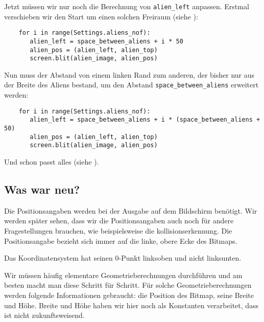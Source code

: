 Jetzt müssen wir nur noch die Berechnung von \texttt{alien\_left} anpassen. Erstmal verschieben wir den Start um einen solchen Freiraum (siehe ):

\lstset{firstnumber=43}
\begin{lstlisting}
	for i in range(Settings.aliens_nof):
	   alien_left = space_between_aliens + i * 50
	   alien_pos = (alien_left, alien_top)
	   screen.blit(alien_image, alien_pos)
\end{lstlisting}


Nun muss der Abstand von einem linken Rand zum anderen, der bisher nur aus der Breite des Aliens bestand, um den Abstand \texttt{space\_between\_aliens} erweitert werden:

\lstset{firstnumber=43}
\begin{lstlisting}
	for i in range(Settings.aliens_nof):
	   alien_left = space_between_aliens + i * (space_between_aliens + 50)
	   alien_pos = (alien_left, alien_top)
	   screen.blit(alien_image, alien_pos)
\end{lstlisting} 

Und schon passt alles (siehe ).



\subsection*{Was war neu?}

Die Positionsangaben werden bei der Ausgabe auf dem Bildschirm benötigt. Wir werden später sehen, dass wir die Positionsangaben auch noch für andere Fragestellungen brauchen, wie beispielsweise die \Gls{kollisionserkennung}. Die Positionsangabe bezieht sich immer auf die linke, obere Ecke des Bitmaps. 
	
Das Koordinatensystem hat seinen 0-Punkt linksoben und nicht linksunten.
	
Wir müssen häufig elementare Geometrieberechnungen durchführen und am besten macht man diese Schritt für Schritt. Für solche Geometrieberechnungen werden folgende Informationen gebraucht: die Position des Bitmap, seine Breite und Höhe. Breite und Höhe haben wir hier noch als Konstanten verarbeitet, dass ist nicht zukunftsweisend.


